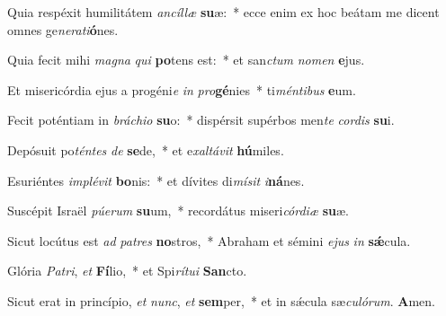 ﻿\item Quia respéxit humilitátem \textit{an}\textit{cíl}\textit{læ} \textbf{su}æ:~* ecce enim ex hoc beátam me dicent omnes ge\textit{ne}\textit{ra}\textit{ti}\textbf{ó}nes.

\item Quia fecit mihi \textit{ma}\textit{gna} \textit{qui} \textbf{po}tens est:~* et san\textit{ctum} \textit{no}\textit{men} \textbf{e}jus.

\item Et misericórdia ejus a progéni\textit{e} \textit{in} \textit{pro}\textbf{gé}nies~* ti\textit{mén}\textit{ti}\textit{bus} \textbf{e}um.

\item Fecit poténtiam in \textit{brá}\textit{chi}\textit{o} \textbf{su}o:~* dispérsit supérbos men\textit{te} \textit{cor}\textit{dis} \textbf{su}i.

\item Depósuit po\textit{tén}\textit{tes} \textit{de} \textbf{se}de,~* et e\textit{xal}\textit{tá}\textit{vit} \textbf{hú}miles.

\item Esuriéntes \textit{im}\textit{plé}\textit{vit} \textbf{bo}nis:~* et dívites di\textit{mí}\textit{sit} \textit{i}\textbf{ná}nes.

\item Suscépit Israël \textit{pú}\textit{e}\textit{rum} \textbf{su}um,~* recordátus miseri\textit{cór}\textit{di}\textit{æ} \textbf{su}æ.

\item Sicut locútus est \textit{ad} \textit{pa}\textit{tres} \textbf{no}stros,~* Abraham et sémini \textit{e}\textit{jus} \textit{in} \textbf{sǽ}cula.

\item Glória \textit{Pa}\textit{tri}, \textit{et} \textbf{Fí}lio,~* et Spi\textit{rí}\textit{tu}\textit{i} \textbf{San}cto.

\item Sicut erat in princípio, \textit{et} \textit{nunc}, \textit{et} \textbf{sem}per,~* et in sǽcula sæ\textit{cu}\textit{ló}\textit{rum}. \textbf{A}men.